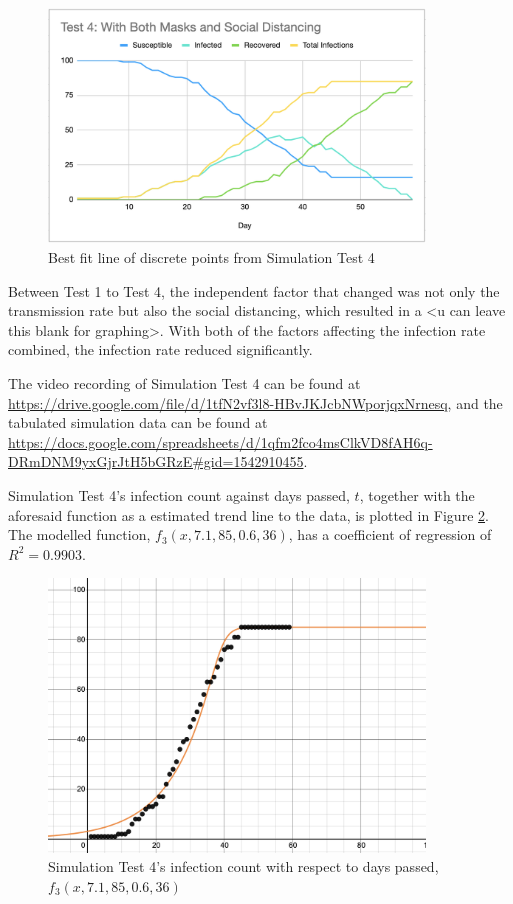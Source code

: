 \documentclass[a4paper,titlepage]{article}
\begin{document}
\begin{figure}[htbp]
    \centering
    \includegraphics[width=10cm]{simT4.png}
    \caption{Best fit line of discrete points from Simulation Test 4}
    \label{fig:simT4}
\end{figure}

Between Test 1 to Test 4, the independent factor that changed was not only the transmission rate but also the social distancing, which resulted in a <u can leave this blank for graphing>. With both of the factors affecting the infection rate combined, the infection rate reduced significantly.

The video recording of Simulation Test 4 can be found at \url{https://drive.google.com/file/d/1tfN2vf3l8-HBvJKJcbNWporjqxNrnesq}, and the tabulated simulation data can be found at \url{https://docs.google.com/spreadsheets/d/1qfm2fco4msClkVD8fAH6q-DRmDNM9yxGjrJtH5bGRzE#gid=1542910455}.

Simulation Test 4's infection count against days passed, $t$, together with the aforesaid function as a estimated trend line to the data, is plotted in Figure \ref{fig:simG4}. The modelled function, $f_3(x,7.1,85,0.6,36)$, has a coefficient of regression of $R^2=0.9903$.

\begin{figure}[htbp]
    \centering
    \includegraphics[width=10cm]{simG4.png}
    \caption{Simulation Test 4's infection count with respect to days passed, $f_3(x,7.1,85,0.6,36)$}
    \label{fig:simG4}
\end{figure}
\end{document}
